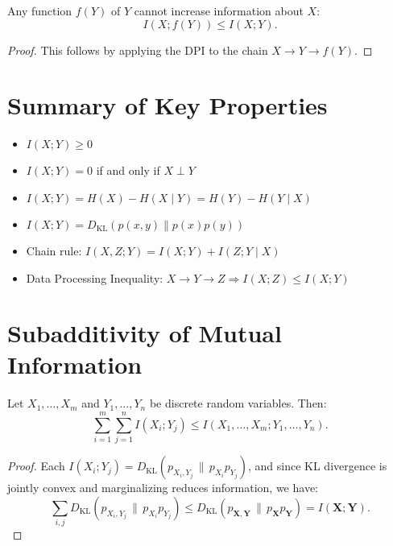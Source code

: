 \documentclass[../../main.tex]{subfiles}
\begin{document}
\begin{corollary}
Any function \( f(Y) \) of \( Y \) cannot increase information about \( X \):
\[
I(X; f(Y)) \leq I(X; Y).
\]
\end{corollary}

\begin{proof}
This follows by applying the DPI to the chain \( X \to Y \to f(Y) \).
\end{proof}

\section{Summary of Key Properties}

\begin{itemize}[leftmargin=1.2cm]
    \item \( I(X; Y) \geq 0 \)
    \item \( I(X; Y) = 0 \) if and only if \( X \perp Y \)
    \item \( I(X; Y) = H(X) - H(X \mid Y) = H(Y) - H(Y \mid X) \)
    \item \( I(X; Y) = D_{\mathrm{KL}}(p(x, y) \| p(x)p(y)) \)
    \item Chain rule: \( I(X, Z; Y) = I(X; Y) + I(Z; Y \mid X) \)
    \item Data Processing Inequality: \( X \to Y \to Z \Rightarrow I(X; Z) \leq I(X; Y) \)
\end{itemize}

\section{Subadditivity of Mutual Information}

\begin{theorem}
Let \( X_1, \dots, X_m \) and \( Y_1, \dots, Y_n \) be discrete random variables. Then:
\[
\sum_{i=1}^{m} \sum_{j=1}^{n} I(X_i; Y_j) \leq I(X_1, \dots, X_m; Y_1, \dots, Y_n).
\]
\end{theorem}

\begin{proof}
Each \( I(X_i; Y_j) = D_{\mathrm{KL}}(p_{X_i, Y_j} \,\|\, p_{X_i} p_{Y_j}) \), and since KL divergence is jointly convex and marginalizing reduces information, we have:
\[
\sum_{i,j} D_{\mathrm{KL}}(p_{X_i, Y_j} \,\|\, p_{X_i} p_{Y_j}) \leq D_{\mathrm{KL}}(p_{\mathbf{X}, \mathbf{Y}} \,\|\, p_{\mathbf{X}} p_{\mathbf{Y}}) = I(\mathbf{X}; \mathbf{Y}).
\]
\end{proof}
\end{document}
